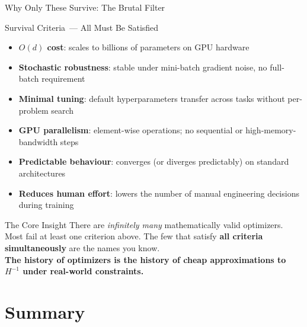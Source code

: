 \documentclass{beamer}
\begin{document}
\begin{frame}[shrink=10]{Why Only These Survive: The Brutal Filter}
  \begin{block}{Survival Criteria~--- All Must Be Satisfied}
    \begin{itemize}\setlength\itemsep{6pt}
      \item \textbf{$O(d)$ cost}: scales to billions of parameters
            on GPU hardware
      \item \textbf{Stochastic robustness}: stable under mini-batch
            gradient noise, no full-batch requirement
      \item \textbf{Minimal tuning}: default hyperparameters
            transfer across tasks without per-problem search
      \item \textbf{GPU parallelism}: element-wise operations;
            no sequential or high-memory-bandwidth steps
      \item \textbf{Predictable behaviour}: converges (or diverges
            predictably) on standard architectures
      \item \textbf{Reduces human effort}: lowers the number of
            manual engineering decisions during training
    \end{itemize}
  \end{block}

  \begin{alertblock}{The Core Insight}
    There are \emph{infinitely many} mathematically valid optimizers.
    Most fail at least one criterion above.
    The few that satisfy \textbf{all criteria simultaneously}
    are the names you know.\\[4pt]
    \textbf{The history of optimizers is the history of cheap
    approximations to $H^{-1}$ under real-world constraints.}
  \end{alertblock}
\end{frame}

\section{Summary}
\end{document}

